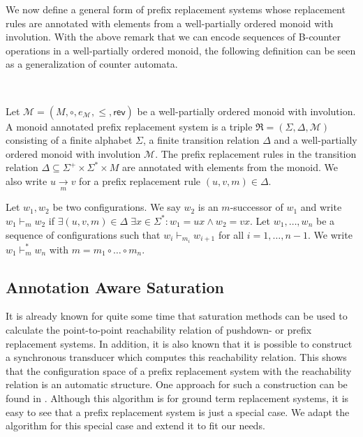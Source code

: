 \documentclass{LMCS}
\newcommand{\prsR}{\mathfrak R}
\newcommand{\configstepCost}[1]{\vdash_{#1}}
\newcommand{\configstepsCost}[2][*]{\vdash^{#1}_{#2}}
\newcommand{\pdsrule}[3]{#1 \xrightarrow[#2]{} #3}
\newcommand{\rev}{\mathsf{rev}}
\newcommand{\annotationMonoidM}{\mathcal M}
\newcommand{\neutralM}[1][]{e_{\annotationMonoidM_{#1}}}
\begin{document}
We now define a general form of prefix replacement systems whose replacement
rules are annotated with elements from a well-partially ordered monoid with
involution. With the above remark that we can encode sequences of 
B-counter operations in a well-partially ordered monoid, the following 
definition can be seen as a generalization of counter automata.

\begin{defi}\label{def:ResourcePRS}\ 

Let $\annotationMonoidM = (M,\circ,\neutralM,\le,\rev)$ be a well-partially ordered
  monoid with involution.
  A monoid annotated prefix replacement system is a triple $\prsR =
(\Sigma,\Delta,\annotationMonoidM)$ consisting of a finite alphabet $\Sigma$, a
finite transition relation $\Delta$ and a well-partially ordered monoid with
involution $\annotationMonoidM$.
  The prefix replacement rules in the transition relation $\Delta \subseteq
\Sigma^+ \times \Sigma^* \times M$ are annotated with elements from the monoid.
We also write $\pdsrule{u}{m}{v}$ for a prefix replacement rule $(u,v,m) \in
\Delta$.

 Let $w_1,w_2$ be two configurations. We say $w_2$ is an $m$-successor of $w_1$
and write $w_1 \configstepCost{m} w_2$ if $\exists (u,v,m) \in \Delta \;\exists
x \in \Sigma^*: w_1 = ux \wedge w_2 = vx$. Let $w_1, \ldots, w_n$ be a sequence
of configurations such that $w_i \configstepCost{m_i} w_{i+1}$ for all
$i = 1, \ldots, n-1$. We write $w_1 \configstepsCost{m} w_n$ with $m = m_1 \circ
\ldots \circ m_n$.
\end{defi}


\subsection{Annotation Aware Saturation}
\label{subsec:AnnotationAwareSat}

It is already known for quite some time that saturation methods can be used to
calculate the point-to-point reachability relation of pushdown- or prefix
replacement systems. In addition, it is also known that it is possible to
construct a synchronous transducer which computes this reachability relation.
This shows that the configuration space of a prefix replacement system with the
reachability relation is an automatic structure. One approach for such a
construction can be found in \cite{gtt-saturation}. Although this 
algorithm is for ground term replacement systems, it is easy to see that a
prefix replacement system is just a special case. We adapt the algorithm for
this special case and extend it to fit our needs.
\end{document}
